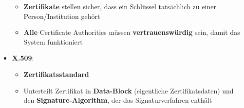 \begin{itemize}
\begin{itemize}
		\item \textbf{Zertifikate} stellen sicher, dass ein Schlüssel tatsächlich zu einer Person/Institution gehört
		\item \textbf{Alle} Certificate Authorities müssen \textbf{vertrauenswürdig} sein, damit das System funktioniert
	\end{itemize}
	\item \textbf{X.509}:
	\begin{itemize}
		\item \textbf{Zertifikatsstandard}
		\item Unterteilt Zertifikat in \textbf{Data-Block} (eigentliche Zertifikatsdaten) und den \textbf{Signature-Algorithm}, der das Signaturverfahren enthält
	\end{itemize}
\end{itemize}
